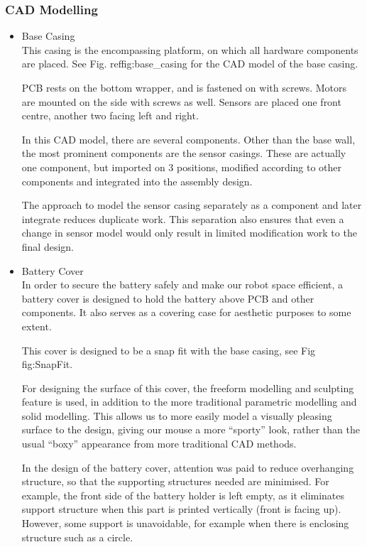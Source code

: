 \subsubsection{CAD Modelling}
\begin{itemize}
    \item Base Casing\\ 
    This casing is the encompassing platform, on which all hardware components are placed. See Fig. ref{fig:base_casing} for the CAD model of the base casing.

    PCB rests on the bottom wrapper, and is fastened on with screws. Motors are mounted on the side with screws as well. Sensors are placed one front centre, another two facing left and right.

    In this CAD model, there are several components. Other than the base wall, the most prominent components are the sensor casings. These are actually one component, but imported on 3 positions, modified according to other components and integrated into the assembly design. 

    The approach to model the sensor casing separately as a component and later integrate reduces duplicate work. This separation also ensures that even a change in sensor model would only result in limited modification work to the final design.

    \item Battery Cover\\ 
    In order to secure the battery safely and make our robot space efficient, a battery cover is designed to hold the battery above PCB and other components. It also serves as a covering case for aesthetic purposes to some extent.

    This cover is designed to be a snap fit with the base casing, see Fig {fig:SnapFit}.

    For designing the surface of this cover, the freeform modelling and sculpting feature is used, in addition to the more traditional parametric modelling and solid modelling. This allows us to more easily model a visually pleasing surface to the design, giving our mouse a more “sporty” look, rather than the usual “boxy” appearance from more traditional CAD methods.

    In the design of the battery cover, attention was paid to reduce overhanging structure, so that the supporting structures needed are minimised. For example, the front side of the battery holder is left empty, as it eliminates support structure when this part is printed vertically (front is facing up). However, some support is unavoidable, for example when there is enclosing structure such as a circle.

\end{itemize}


